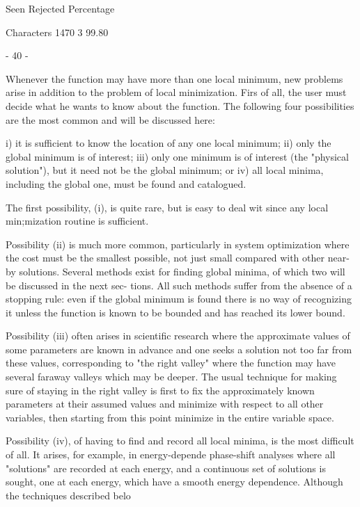                  Seen Rejected  Percentage
 
Characters       1470        3   99.80
 
                                 - 40 -
 
 
     Whenever the function may have more than one local minimum, new
problems arise in addition to the problem  of local minimization.  Firs
of all, the user must decide what he wants to know about the function.
The following four possibilities are the most common and will be
discussed here:
 
  i) it is sufficient to know the location of any one local minimum;
 ii) only the global minimum is of interest;
 iii) only one minimum is of interest (the "physical solution"), but it
 need not be the global minimum; or
 iv) all local minima, including the global one, must be found and
 catalogued.
 
     The first possibility, (i), is quite rare, but is easy to deal wit
since any local min;mization routine is sufficient.
 
     Possibility (ii) is much more common, particularly in system
optimization where the cost must be the smallest possible, not just
small compared with other near-by solutions.  Several methods exist for
finding global minima, of which two will be discussed in the next sec-
tions.  All such methods suffer from the absence of a stopping rule:
even if the global minimum is found there is no way of recognizing it
unless the function is known to be bounded and has reached its lower
bound.
 
     Possibility (iii) often arises in scientific research where the
approximate values of some parameters are known in advance and one seeks
a solution not too far from these values, corresponding to "the right
valley" where the function may have several faraway valleys which may
be deeper.  The usual technique for making sure of staying in the right
valley is first to fix the approximately known parameters at their
assumed values and minimize with respect to all other variables, then
starting from this point minimize in the entire variable space.
 
     Possibility (iv), of having to find and record all local minima,
is the most difficult of all.  It arises, for example, in energy-depende
phase-shift analyses where all "solutions" are recorded at each energy,
and a continuous set of solutions is sought, one at each energy, which
have a smooth energy dependence.  Although the techniques described belo
 
